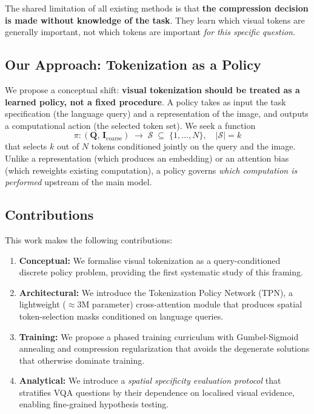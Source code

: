 \documentclass[12pt,a4paper]{article}
\newcommand{\mI}{\mathbf{I}}     %
\newcommand{\mQ}{\mathbf{Q}}     %
\begin{document}
The shared limitation of all existing methods is that \textbf{the compression
decision is made without knowledge of the task}. They learn which visual tokens
are generally important, not which tokens are important \emph{for this specific
question}.

\subsection{Our Approach: Tokenization as a Policy}

We propose a conceptual shift: \textbf{visual tokenization should be treated as
a learned policy, not a fixed procedure}. A policy takes as input the task
specification (the language query) and a representation of the image, and outputs
a computational action (the selected token set). We seek a function
\[
  \pi\colon (\mQ,\, \mI_{\mathrm{coarse}}) \;\longrightarrow\; \mathcal{S}
    \;\subseteq\; \{1, \ldots, N\}, \quad |\mathcal{S}| = k
\]
that selects $k$ out of $N$ tokens conditioned jointly on the query and the
image. Unlike a representation (which produces an embedding) or an attention
bias (which reweights existing computation), a policy governs \emph{which
computation is performed} upstream of the main model.

\subsection{Contributions}

This work makes the following contributions:

\begin{enumerate}[leftmargin=2em]
  \item \textbf{Conceptual:} We formalise visual tokenization as a
    query-conditioned discrete policy problem, providing the first systematic
    study of this framing.
  \item \textbf{Architectural:} We introduce the Tokenization Policy Network
    (TPN), a lightweight ($\approx 3$M parameter) cross-attention module that
    produces spatial token-selection masks conditioned on language queries.
  \item \textbf{Training:} We propose a phased training curriculum with
    Gumbel-Sigmoid annealing and compression regularization that avoids the
    degenerate solutions that otherwise dominate training.
  \item \textbf{Analytical:} We introduce a \emph{spatial specificity evaluation
    protocol} that stratifies VQA questions by their dependence on localised
    visual evidence, enabling fine-grained hypothesis testing.
\end{enumerate}
\end{document}
